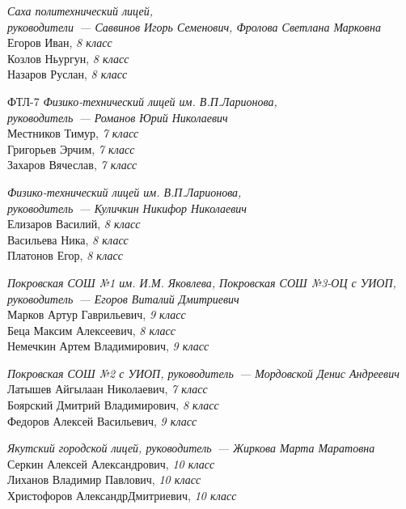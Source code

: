 \begin{description}[style=unboxed, labelwidth=\linewidth, font=\bfseries, listparindent=0pt, leftmargin=15pt, parsep=0pt]
\item[Фломастеры]
\textit{Саха политехнический лицей, \\
руководители~— Саввинов Игорь Семенович, Фролова Светлана Марковна} \\
Егоров Иван, \textit{8 класс} \\
Козлов Ньургун, \textit{8 класс} \\
Назаров Руслан, \textit{8 класс}

\item ФТЛ-7
\textit{Физико-технический лицей им. В.П.Ларионова, \\
руководитель~— Романов Юрий Николаевич} \\
Местников Тимур, \textit{7 класс} \\
Григорьев Эрчим, \textit{7 класс} \\
Захаров Вячеслав, \textit{7 класс}

\item[ФТЛ-8]
\textit{Физико-технический лицей им. В.П.Ларионова, \\
руководитель~— Куличкин Никифор Николаевич} \\
Елизаров Василий, \textit{8 класс} \\
Васильева Ника, \textit{8 класс} \\
Платонов Егор, \textit{8 класс}

\item[Ханалас 1]
\textit{Покровская СОШ №1 им. И.М. Яковлева, Покровская СОШ №3-ОЦ с УИОП, \\
руководитель~— Егоров Виталий Дмитриевич} \\
Марков Артур Гаврильевич, \textit{9 класс} \\
Беца Максим Алексеевич, \textit{8 класс} \\
Немечкин Артем Владимирович, \textit{9 класс}

\item[Ханалас 2]
\textit{Покровская СОШ №2 с УИОП, руководитель~— Мордовской Денис Андреевич} \\
Латышев Айгылаан Николаевич, \textit{7 класс} \\
Боярский Дмитрий Владимирович, \textit{8 класс} \\
Федоров Алексей Васильевич, \textit{9 класс}

\item[ЯГЛ]
\textit{Якутский городской лицей, руководитель~— Жиркова Марта Маратовна} \\
Серкин Алексей Александрович, \textit{10 класс} \\
Лиханов Владимир Павлович, \textit{10 класс} \\
Христофоров АлександрДмитриевич, \textit{10 класс}


\end{description}
